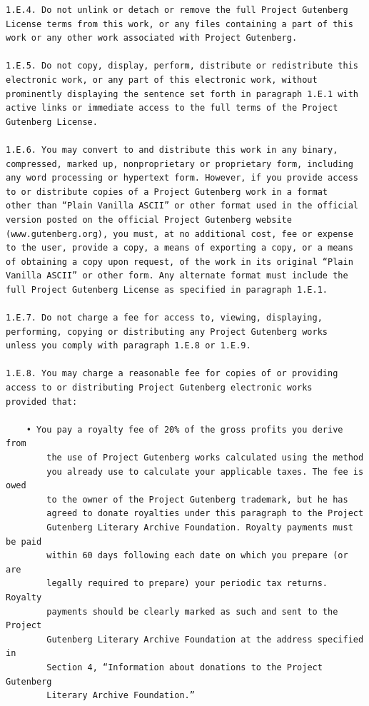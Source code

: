 \documentclass{article}
\begin{document}
\begin{verbatim}
1.E.4. Do not unlink or detach or remove the full Project Gutenberg
License terms from this work, or any files containing a part of this
work or any other work associated with Project Gutenberg.

1.E.5. Do not copy, display, perform, distribute or redistribute this
electronic work, or any part of this electronic work, without
prominently displaying the sentence set forth in paragraph 1.E.1 with
active links or immediate access to the full terms of the Project
Gutenberg License.

1.E.6. You may convert to and distribute this work in any binary,
compressed, marked up, nonproprietary or proprietary form, including
any word processing or hypertext form. However, if you provide access
to or distribute copies of a Project Gutenberg work in a format
other than “Plain Vanilla ASCII” or other format used in the official
version posted on the official Project Gutenberg website
(www.gutenberg.org), you must, at no additional cost, fee or expense
to the user, provide a copy, a means of exporting a copy, or a means
of obtaining a copy upon request, of the work in its original “Plain
Vanilla ASCII” or other form. Any alternate format must include the
full Project Gutenberg License as specified in paragraph 1.E.1.

1.E.7. Do not charge a fee for access to, viewing, displaying,
performing, copying or distributing any Project Gutenberg works
unless you comply with paragraph 1.E.8 or 1.E.9.

1.E.8. You may charge a reasonable fee for copies of or providing
access to or distributing Project Gutenberg electronic works
provided that:

    • You pay a royalty fee of 20% of the gross profits you derive from
        the use of Project Gutenberg works calculated using the method
        you already use to calculate your applicable taxes. The fee is owed
        to the owner of the Project Gutenberg trademark, but he has
        agreed to donate royalties under this paragraph to the Project
        Gutenberg Literary Archive Foundation. Royalty payments must be paid
        within 60 days following each date on which you prepare (or are
        legally required to prepare) your periodic tax returns. Royalty
        payments should be clearly marked as such and sent to the Project
        Gutenberg Literary Archive Foundation at the address specified in
        Section 4, “Information about donations to the Project Gutenberg
        Literary Archive Foundation.”


\end{verbatim}
\end{document}
